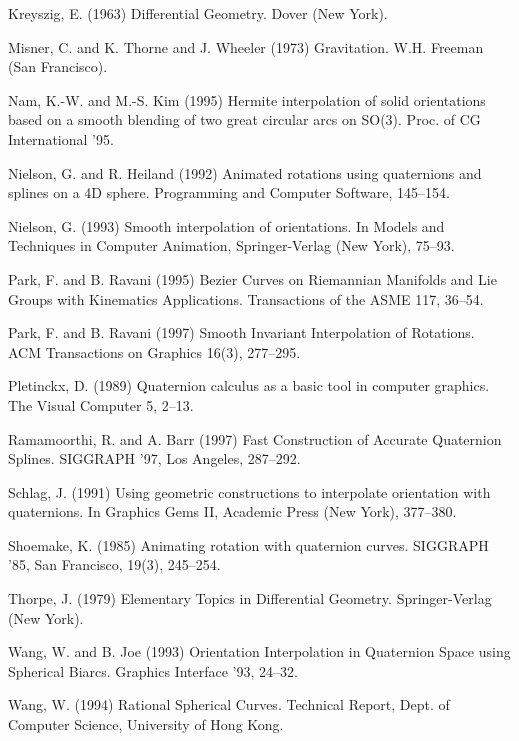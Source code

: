 \begin{thebibliography}{Lozano-Perez 83}
Kreyszig, E. (1963)
Differential Geometry.
Dover (New York).

Misner, C. and K. Thorne and J. Wheeler (1973)
Gravitation.
W.H. Freeman (San Francisco).

Nam, K.-W. and M.-S. Kim (1995)
Hermite interpolation of solid orientations based on a smooth blending
of two great circular arcs on SO(3).
Proc. of CG International '95.

Nielson, G. and R. Heiland (1992)
Animated rotations using quaternions and splines on a 4D sphere.
Programming and Computer Software, 145--154.

Nielson, G. (1993)
Smooth interpolation of orientations.
In Models and Techniques in Computer Animation, Springer-Verlag (New York),
75--93.

Park, F. and B. Ravani (1995)
Bezier Curves on Riemannian Manifolds and Lie Groups with
Kinematics Applications.
Transactions of the ASME 117, 36--54.

Park, F. and B. Ravani (1997)
Smooth Invariant Interpolation of Rotations.
ACM Transactions on Graphics 16(3), 277--295.

Pletinckx, D. (1989) 
Quaternion calculus as a basic tool in computer graphics.
The Visual Computer 5, 2--13.

Ramamoorthi, R. and A. Barr (1997)
Fast Construction of Accurate Quaternion Splines.
SIGGRAPH '97, Los Angeles, 287--292.

Schlag, J. (1991) Using geometric constructions to interpolate
orientation with quaternions.  In Graphics Gems II, Academic Press (New York),
377--380.

Shoemake, K. (1985) Animating rotation with quaternion curves.
SIGGRAPH '85, San Francisco, 19(3), 245--254.

Thorpe, J. (1979)
Elementary Topics in Differential Geometry.
Springer-Verlag (New York).

Wang, W. and B. Joe (1993)
Orientation Interpolation in Quaternion Space using Spherical Biarcs.
Graphics Interface '93, 24--32.

Wang, W. (1994)
Rational Spherical Curves.
Technical Report, Dept. of Computer Science, University of Hong Kong.


\end{thebibliography}







